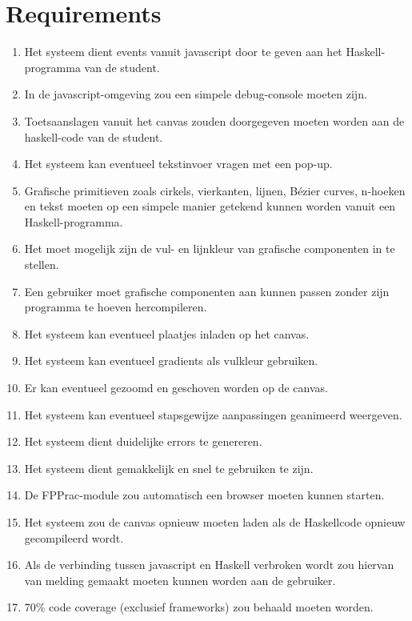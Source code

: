 \section{Requirements}

\begin{enumerate}[{R}1]
	\item Het systeem dient events vanuit javascript door te geven aan het Haskell-programma van de student.
	\item In de javascript-omgeving zou een simpele debug-console moeten zijn.
	\item Toetsaanslagen vanuit het canvas zouden doorgegeven moeten worden aan de haskell-code van de student. 
	\item Het systeem kan eventueel tekstinvoer vragen met een pop-up.
	\item Grafische primitieven zoals cirkels, vierkanten, lijnen, Bézier curves, n-hoeken en tekst moeten op een simpele manier getekend kunnen worden vanuit een Haskell-programma.
	\item Het moet mogelijk zijn de vul- en lijnkleur van grafische componenten in te stellen.
	\item Een gebruiker moet grafische componenten aan kunnen passen zonder zijn programma te hoeven hercompileren.
	\item Het systeem kan eventueel plaatjes inladen op het canvas.
	\item Het systeem kan eventueel gradients als vulkleur gebruiken.
	\item Er kan eventueel gezoomd en geschoven worden op de canvas.
	\item Het systeem kan eventueel stapsgewijze aanpassingen geanimeerd weergeven.
	\item Het systeem dient duidelijke errors te genereren.
	\item Het systeem dient gemakkelijk en snel te gebruiken te zijn.
	\item De FPPrac-module zou automatisch een browser moeten kunnen starten.
	\item  Het systeem zou de canvas opnieuw moeten laden als de Haskellcode opnieuw gecompileerd wordt.
	\item Als de verbinding tussen javascript en Haskell verbroken wordt zou hiervan van melding gemaakt moeten kunnen worden aan de gebruiker. 
	\item 70\% code coverage (exclusief frameworks) zou behaald moeten worden.
\end{enumerate}